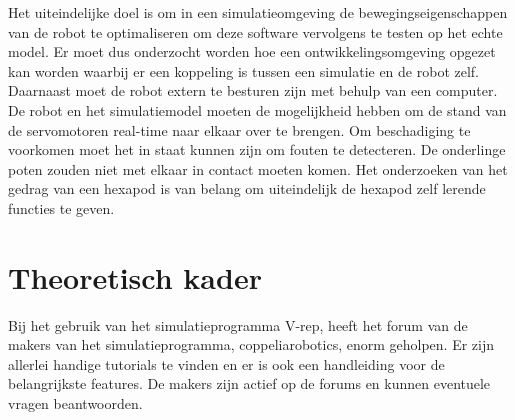 \documentclass[10pt,a4paper]{article}
\begin{document}
Het uiteindelijke doel is om in een simulatieomgeving de bewegingseigenschappen van de robot te optimaliseren om deze software vervolgens te testen op het echte model. Er moet dus onderzocht worden hoe een ontwikkelingsomgeving opgezet kan worden waarbij er een koppeling is tussen een simulatie en de robot zelf. Daarnaast moet de robot extern te besturen zijn met behulp van een computer. De robot en het simulatiemodel moeten de mogelijkheid hebben om de stand van de servomotoren real-time naar elkaar over te brengen. Om beschadiging te voorkomen moet het in staat kunnen zijn om fouten te detecteren. De onderlinge poten zouden niet met elkaar in contact moeten komen. Het onderzoeken van het gedrag van een hexapod is van belang om uiteindelijk de hexapod zelf lerende functies te geven.
\newpage

\section{Theoretisch kader}
Bij het gebruik van het simulatieprogramma V-rep, heeft het forum van de makers van het simulatieprogramma, coppeliarobotics, enorm geholpen. Er zijn allerlei handige tutorials te vinden en er is ook een handleiding voor de belangrijkste features. De makers zijn actief op de forums en kunnen eventuele vragen beantwoorden.
\end{document}
